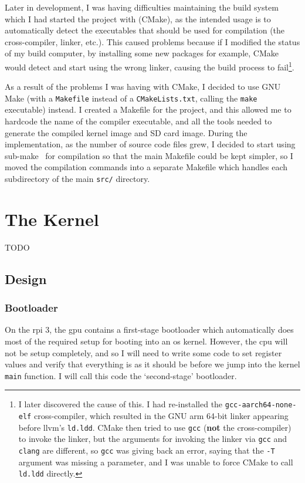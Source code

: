 \documentclass{article}
\begin{document}
Later in development, I was having difficulties maintaining the build system
which I had started the project with (CMake), as the intended usage is to
automatically detect the executables that should be used for compilation (the
cross-compiler, linker, etc.). This caused problems because if I modified the
status of my build computer, by installing some new packages for example, CMake
would detect and start using the wrong linker, causing the build process to
fail\footnote{I later discovered the cause of this. I had re-installed the
\texttt{gcc-aarch64-none-elf} cross-compiler, which resulted in the GNU
\gls{arm} 64-bit linker appearing before llvm's \texttt{ld.ldd}. CMake then
tried to use \texttt{gcc} (\textbf{not} the cross-compiler) to invoke the
linker, but the arguments for invoking the linker via \texttt{gcc} and
\texttt{clang} are different, so \texttt{gcc} was giving back an error, saying
that the \texttt{-T} argument was missing a parameter, and I was unable to
force CMake to call \texttt{ld.ldd} directly.}.

As a result of the problems I was having with CMake, I decided to use GNU Make
(with a \texttt{Makefile} instead of a \texttt{CMakeLists.txt}, calling the
\texttt{make} executable) instead. I created a Makefile for the project, and
this allowed me to hardcode the name of the compiler executable, and all the
tools needed to generate the compiled kernel image and SD card image. During
the implementation, as the number of source code files grew, I decided to start
using sub-make~\cite{sub-make} for compilation so that the main Makefile could
be kept simpler, so I moved the compilation commands into a separate Makefile
which handles each subdirectory of the main \texttt{src/} directory.

\section{The Kernel}
TODO
\subsection{Design}
\label{sec:kernel_design}

\subsubsection{Bootloader}
On the \gls{rpi} 3, the \gls{gpu} contains a first-stage bootloader which
automatically does most of the required setup for booting into an \gls{os}
kernel. However, the \gls{cpu} will not be setup completely, and so I will need
to write some code to set register values and verify that everything is as it
should be before we jump into the kernel \texttt{main} function. I will call
this code the `second-stage' bootloader.
\end{document}
